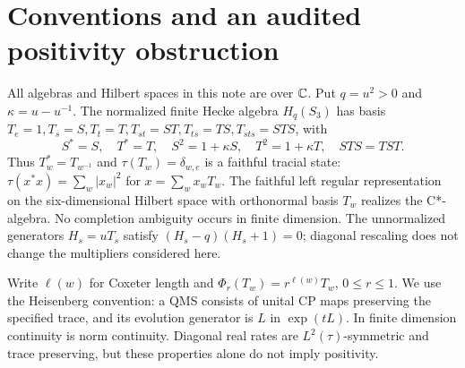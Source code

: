 \section{Conventions and an audited positivity obstruction}
All algebras and Hilbert spaces in this note are over $\mathbb C$. Put $q=u^2>0$
and $\kappa=u-u^{-1}$. The normalized finite Hecke algebra $H_q(S_3)$ has
basis $T_e=1,T_s=S,T_t=T,T_{st}=ST,T_{ts}=TS,T_{sts}=STS$, with
\begin{equation}\label{eq:p2-relations}
 S^*=S,\quad T^*=T,\quad S^2=1+\kappa S,\quad
 T^2=1+\kappa T,\quad STS=TST.
\end{equation}
Thus $T_w^*=T_{w^{-1}}$ and $\tau(T_w)=\delta_{w,e}$ is a faithful tracial
state: $\tau(x^*x)=\sum_w|x_w|^2$ for $x=\sum_wx_wT_w$.
The faithful left regular representation on the six-dimensional Hilbert
space with orthonormal basis $T_w$ realizes the C*-algebra. No completion
ambiguity occurs in finite dimension. The unnormalized generators
$H_s=uT_s$ satisfy $(H_s-q)(H_s+1)=0$; diagonal rescaling does not change
the multipliers considered here.

Write $\ell(w)$ for Coxeter length and $\Phi_r(T_w)=r^{\ell(w)}T_w$,
$0\leq r\leq1$. We use the Heisenberg convention: a QMS consists of unital
CP maps preserving the specified trace, and its evolution generator is
$L$ in $\exp(tL)$. In finite dimension continuity is norm continuity.
Diagonal real rates are $L^2(\tau)$-symmetric and trace preserving, but
these properties alone do not imply positivity.

